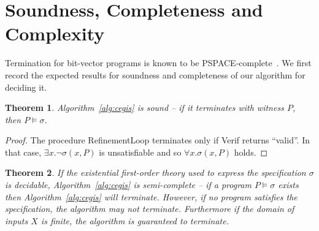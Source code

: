 \documentclass[preprint]{sigplanconf}
\newtheorem{theorem}{Theorem}
\theoremstyle{definition}
\begin{document}


\section{Soundness, Completeness and Complexity}

Termination for bit-vector programs is known to be
PSPACE-complete~\cite{DBLP:conf/tacas/CookKRW10}.  We first record the
expected results for soundness and completeness of our algorithm for
deciding it.
%
\begin{theorem}\label{thm:synth-sound}
Algorithm~\ref{alg:cegis} is sound -- if it terminates with witness $P$, then
$P \models \sigma$.
\end{theorem}

\begin{proof}
 The procedure {\sc RefinementLoop} terminates only if {\sc Verif} returns ``valid''.  In that
 case, $\exists x . \lnot \sigma(x, P)$ is unsatisfiable and so $\forall x . \sigma(x, P)$ holds.
\end{proof}

\begin{theorem}
 \label{thm:synth-semicomplete}
 If the existential first-order theory used to express the specification $\sigma$ is decidable,
 Algorithm~\ref{alg:cegis} is semi-complete -- if a program $P \models \sigma$
 exists then Algorithm~\ref{alg:cegis} will terminate.  However, if no program
 satisfies the specification, the algorithm may not terminate.  Furthermore if the domain of inputs $X$
 is finite, the algorithm is guaranteed to terminate.
\end{theorem}
\end{document}
